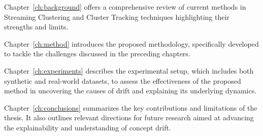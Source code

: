 Chapter~\ref{ch:background} offers a comprehensive review of current methods in
Streaming Clustering and Cluster Tracking techniques highlighting their
strengths and limits.

Chapter~\ref{ch:method} introduces the proposed methodology, specifically
developed to tackle the challenges discussed in the preceding chapters.

Chapter~\ref{ch:experiments} describes the experimental setup, which includes
both synthetic and real-world datasets, to assess the effectiveness of the
proposed method in uncovering the causes of drift and explaining its underlying
dynamics.

Chapter~\ref{ch:conclusions} summarizes the key contributions and limitations
of the thesis. It also outlines relevant directions for future research aimed
at advancing the explainability and understanding of concept drift.